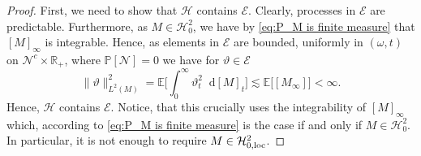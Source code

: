 \documentclass[11pt,a4paper,twoside,openany]{report}
\numberwithin{equation}{section}
\newcommand{\diff}{\mathop{}\!\mathrm{d}}
\theoremstyle{plain} %
\theoremstyle{definition} %
\theoremstyle{remark} %
\begin{document}
\begin{proof}
 
      First, we need to show that \(\mathcal{H}\) contains \(\mathcal{E}\). Clearly, processes in \(\mathcal{E}\) are predictable. Furthermore, as \(M\in\mathcal{H}^2_0\), we have by \eqref{eq:P_M is finite measure} that \([M]_\infty\) is integrable. Hence, as elements in \(\mathcal{E}\) are bounded, uniformly in \((\omega, t)\) on \(\mathcal{N}^c\times\mathbb{R}_+\), where \(\mathbb{P}[\mathcal{N}]=0\) we have for \(\vartheta\in\mathcal{E}\)
    \begin{equation*}
        \lVert\vartheta\rVert_{L^2(M)}^2=\mathbb{E}\bigg[\int_0^{\infty}\vartheta_t^2\diff [M]_t\bigg]\lesssim\mathbb{E}\big[[M_\infty]\big]<\infty.
    \end{equation*}
    Hence, \(\mathcal{H}\) contains \(\mathcal{E}\). Notice, that this crucially uses the integrability of \([M]_\infty\) which, according to \eqref{eq:P_M is finite measure} is the case if and only if \(M\in\mathcal{H}^2_0\). In particular, it is not enough to require \(M\in\mathcal{H}_{0,\rm{loc}}^2\).  
    

\end{proof}
\end{document}
